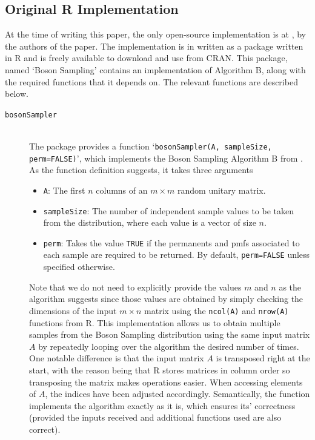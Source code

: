 \documentclass[11pt]{article}
\theoremstyle{theorem}
\theoremstyle{remark}
\theoremstyle{plain}
\theoremstyle{definition}
\begin{document}
\subsection{Original R Implementation} \label{sec:r_code}
At the time of writing this paper, the only open-source implementation is at \cite{clifford_r2017}, by the authors of the paper. The implementation is in written as a package written in R and is freely available to download and use from CRAN. This package, named `Boson Sampling' contains an implementation of Algorithm B, along with the required functions that it depends on. The relevant functions are described below.
\begin{description}
\item[\texttt{bosonSampler}] \hfill \\ The package provides a function `\texttt{bosonSampler(A, sampleSize, perm=FALSE)}', which implements the Boson Sampling Algorithm B from \cite{clifford17}. As the function definition suggests, it takes three arguments
\begin{itemize}
\item \texttt{A}: The first $n$ columns of an $m \times m$ random unitary matrix.
\item \texttt{sampleSize}: The number of independent sample values to be taken from the distribution, where each value is a vector of size $n$.
\item \texttt{perm}: Takes the value \texttt{TRUE} if the permanents and pmfs associated to each sample are required to be returned. By default, \texttt{perm=FALSE} unless specified otherwise.
\end{itemize}
Note that we do not need to explicitly provide the values $m$ and $n$ as the algorithm suggests since those values are obtained by simply checking the dimensions of the input $m \times n$ matrix using the \texttt{ncol(A)} and \texttt{nrow(A)} functions from R. This implementation allows us to obtain multiple samples from the Boson Sampling distribution using the same input matrix $A$ by repeatedly looping over the algorithm the desired number of times. One notable difference is that the input matrix $A$ is transposed right at the start, with the reason being that R stores matrices in column order so transposing the matrix makes operations easier. When accessing elements of $A$, the indices have been adjusted accordingly. Semantically, the function implements the algorithm exactly as it is, which ensures its' correctness (provided the inputs received and additional functions used are also correct).

\end{description}
\end{document}
